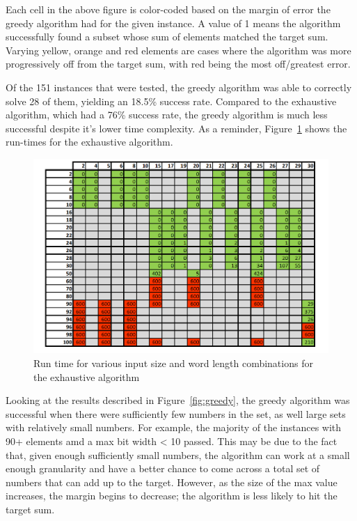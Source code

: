 \documentclass{report}
\begin{document}
Each cell in the above figure is color-coded based on the margin of error
the greedy algorithm had for the given instance. A value of 1 means the algorithm
successfully found a subset whose sum of elements matched the target sum. 
Varying yellow, orange and red elements are cases where the algorithm was more
progressively off from the target sum, with red being the most off/greatest error.

Of the 151 instances that were tested, the greedy algorithm was able to
correctly solve 28 of them, yielding an 18.5\% success rate. Compared to the
exhaustive algorithm, which had a 76\% success rate, the greedy algorithm 
is much less successful despite it's lower time complexity. As a reminder,
Figure~\ref{fig:exhaustive} shows the run-times for the exhaustive algorithm.

\begin{figure}[h]
\centering
\includegraphics[width=12cm]{P1_res.png}
\caption{Run time for various input size and word length combinations for the exhaustive algorithm}
\label{fig:exhaustive}
\end{figure}

Looking at the results described in Figure~\ref{fig:greedy}, the greedy algorithm was successful
when there were sufficiently few numbers in the set, as well large sets with relatively small numbers.
For example, the majority of the instances with 90+ elements amd a max bit width < 10
passed. This may be due to the fact that, given enough sufficiently small numbers, the algorithm
can work at a small enough granularity and have a better chance to come across a total set
of numbers that can add up to the target. However, as the size of the max value increases,
the margin begins to decrease; the algorithm is less likely to hit the target sum.
\end{document}
